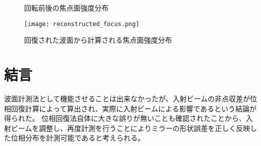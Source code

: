 \begin{figure}[!ht]
\centering
{}
\caption[]{回転前後の焦点面強度分布}
\label{fig:darkflame_deviation_stat}
\end{figure}


\begin{figure}[!ht]
\centering
\texttt{[image: reconstructed\_focus.png]}
\caption{回復された波面から計算される焦点面強度分布}
\label{fig:reconstructed_focus}
\end{figure}


\section{結言}
\label{chap5_conclusion}

波面計測法として機能させることは出来なかったが、入射ビームの非点収差が位相回復計算によって算出され、実際に入射ビームによる影響であるという結論が得られた。
位相回復法自体に大きな誤りが無いことも確認されたことから、入射ビームを調整し、再度計測を行うことによりミラーの形状誤差を正しく反映した位相分布を計測可能であると考えられる。




